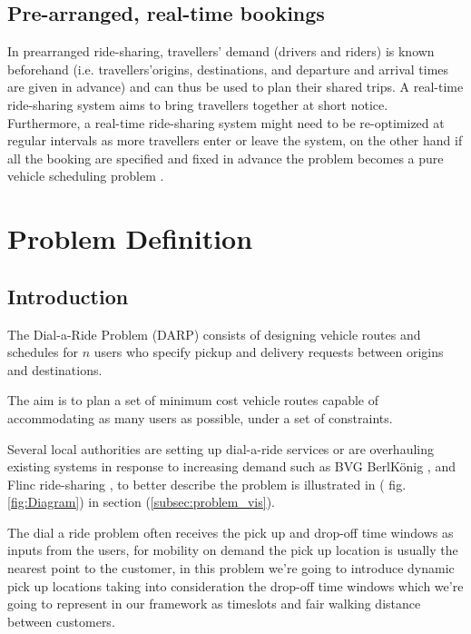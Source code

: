 \documentclass{article}
\begin{document}
\subsection{Pre-arranged, real-time bookings}

In prearranged ride-sharing, travellers’ demand (drivers and riders) is known beforehand (i.e. travellers\rq origins, destinations, and departure and arrival times are given in advance) and can thus be used to plan their shared trips. A real-time ride-sharing system aims to bring travellers together at short notice. Furthermore, a real-time ride-sharing system might need to be re-optimized at regular intervals as more travellers enter or leave the system, on the other hand if all the booking are specified and fixed in advance the problem becomes a pure vehicle scheduling problem \cite{hyland_taxonomy}.



\section{Problem Definition}
\label{sec:Problem_Definition}

\subsection{Introduction}

The Dial-a-Ride Problem (DARP) consists of designing vehicle routes and schedules for $n$ users who specify pickup and delivery requests between origins and destinations. 

The aim is to plan a set of minimum cost vehicle routes capable of accommodating as many users as possible, under a set of constraints.

Several local authorities are setting up dial-a-ride services or are overhauling existing systems in response to increasing demand such as BVG BerlKönig \cite{BerlKonig}, and Flinc ride-sharing \cite{Flinc}, to better describe the problem is illustrated in ( fig. \ref{fig:Diagram}) in section (\ref{subsec:problem_vis}).

The dial a ride problem often receives the pick up and drop-off time windows as inputs from the users, for mobility on demand the pick up location is usually the nearest point to the customer, in this problem we\rq{re} going to introduce dynamic pick up locations taking into consideration the drop-off time windows which we\rq{re} going to represent in our framework as timeslots and fair walking distance between customers.
\end{document}
